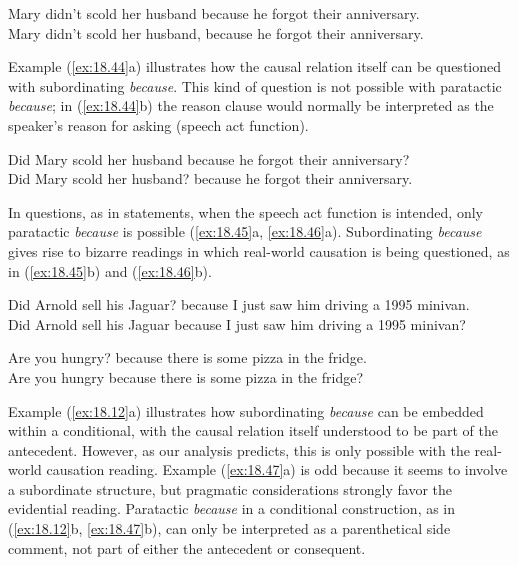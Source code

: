 \ea \label{ex:18.43}
\ea  Mary didn’t scold her husband because he forgot their anniversary.\\
\ex Mary didn’t scold her husband, because he forgot their anniversary.
                       \z
\z


Example (\ref{ex:18.44}a) illustrates how the causal relation itself can be questioned with subordinating \textit{because}. This kind of question is not possible with paratactic \textit{because}; in (\ref{ex:18.44}b) the reason clause would normally be interpreted as the speaker’s reason for asking (speech act function).


\ea \label{ex:18.44}
\ea  Did Mary scold her husband because he forgot their anniversary?\\
\ex Did Mary scold her husband? because he forgot their anniversary.
                       \z
\z


In questions, as in statements, when the speech act function is intended, only paratactic \textit{because} is possible (\ref{ex:18.45}a, \ref{ex:18.46}a). Subordinating \textit{because} gives rise to bizarre readings in which real-world causation is being questioned, as in (\ref{ex:18.45}b) and (\ref{ex:18.46}b).


\ea \label{ex:18.45}
\ea  Did Arnold sell his Jaguar? because I just saw him driving a 1995 minivan.\\
\ex Did Arnold sell his Jaguar because I just saw him driving a 1995 minivan?
                       \z
\z


\ea \label{ex:18.46}
\ea  Are you hungry? because there is some pizza in the fridge.\\
\ex Are you hungry because there is some pizza in the fridge?
                       \z
\z


Example (\ref{ex:18.12}a) illustrates how subordinating \textit{because} can be embedded within a conditional, with the causal relation itself understood to be part of the antecedent. However, as our analysis predicts, this is only possible with the real-world causation reading. Example (\ref{ex:18.47}a) is odd because it seems to involve a subordinate structure, but pragmatic considerations strongly favor the evidential reading. Paratactic \textit{because} in a conditional construction, as in (\ref{ex:18.12}b, \ref{ex:18.47}b), can only be interpreted as a parenthetical side comment, not part of either the antecedent or consequent.


\ea \label{ex:18.12}
\z \z


